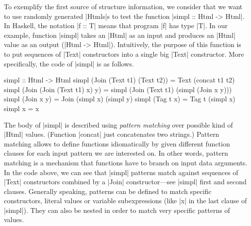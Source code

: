 To exemplify the first source of structure information, we consider that we want
to use randomly generated |Htmls|s to test the function |simpl :: Html ->
Html|.
%
In Haskell, the notation |f :: T| means that program |f| has type |T|.
%
In our example, function |simpl| takes an |Html| as an input and produces an
|Html| value as an output (|Html -> Html|).
%
Intuitively, the purpose of this function is to put sequences of |Text|
constructors into a single big |Text| constructor.
%
More specifically, the code of |simpl| is as follows.
%
\begin{code}
simpl :: Html -> Html
simpl (Join (Text t1) (Text t2))
  = Text (concat t1 t2)
simpl (Join (Join (Text t1) x) y)
  = simpl (Join (Text t1) (simpl (Join x y)))
simpl (Join x y) = Join (simpl x) (simpl y)
simpl (Tag t x) = Tag t (simpl x)
simpl x = x
\end{code}
%
The body of |simpl| is described using \emph{pattern matching} over possible
kind of |Html| values. (Function |concat| just concatenates two strings.)
%
Pattern matching allows to define functions idiomatically by given different
function clauses for each input pattern we are interested on.
%
In other words, pattern matching is a mechanism that functions have to branch on
input data arguments.
%
In the code above, we can see that |simpl| patterns match against sequences of
|Text| constructors combined by a |Join| constructor---see |simpl| first and
second clauses.
%
Generally speaking,
patterns can be defined to match specific constructors, literal values or
 variable subexpressions (like |x| in the last clause of |simpl|).
%
 They can also be nested in order to match very specific patterns of values.



